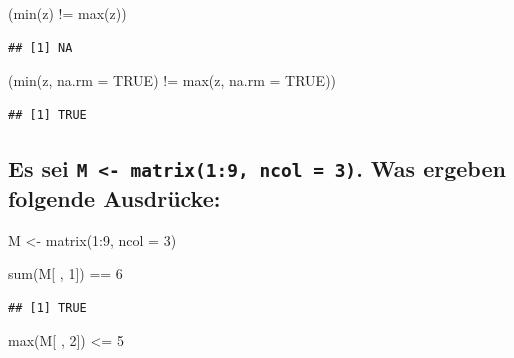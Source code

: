 \documentclass[12pt,a4paper]{article}
\newenvironment{Shaded}{\begin{snugshade}}{\end{snugshade}}
\newcommand{\AttributeTok}[1]{\textcolor[rgb]{0.77,0.63,0.00}{#1}}
\newcommand{\ConstantTok}[1]{\textcolor[rgb]{0.00,0.00,0.00}{#1}}
\newcommand{\DecValTok}[1]{\textcolor[rgb]{0.00,0.00,0.81}{#1}}
\newcommand{\FunctionTok}[1]{\textcolor[rgb]{0.00,0.00,0.00}{#1}}
\newcommand{\NormalTok}[1]{#1}
\newcommand{\OtherTok}[1]{\textcolor[rgb]{0.56,0.35,0.01}{#1}}
\newcommand{\SpecialCharTok}[1]{\textcolor[rgb]{0.00,0.00,0.00}{#1}}
\begin{document}
\begin{Shaded}
\begin{Highlighting}[]
\NormalTok{    (}\FunctionTok{min}\NormalTok{(z) }\SpecialCharTok{!=} \FunctionTok{max}\NormalTok{(z))}
\end{Highlighting}
\end{Shaded}

\begin{verbatim}
## [1] NA
\end{verbatim}

\begin{Shaded}
\begin{Highlighting}[]
\NormalTok{    (}\FunctionTok{min}\NormalTok{(z, }\AttributeTok{na.rm =} \ConstantTok{TRUE}\NormalTok{) }\SpecialCharTok{!=} \FunctionTok{max}\NormalTok{(z, }\AttributeTok{na.rm =} \ConstantTok{TRUE}\NormalTok{))}
\end{Highlighting}
\end{Shaded}

\begin{verbatim}
## [1] TRUE
\end{verbatim}

\hypertarget{es-sei-m---matrix19-ncol-3.-was-ergeben-folgende-ausdruxfccke}{%
\subsection{\texorpdfstring{Es sei
\texttt{M\ \textless{}-\ matrix(1:9,\ ncol\ =\ 3)}. Was ergeben folgende
Ausdrücke:}{Es sei M \textless- matrix(1:9, ncol = 3). Was ergeben folgende Ausdrücke:}}\label{es-sei-m---matrix19-ncol-3.-was-ergeben-folgende-ausdruxfccke}}

\begin{Shaded}
\begin{Highlighting}[]
\NormalTok{    M }\OtherTok{\textless{}{-}} \FunctionTok{matrix}\NormalTok{(}\DecValTok{1}\SpecialCharTok{:}\DecValTok{9}\NormalTok{, }\AttributeTok{ncol =} \DecValTok{3}\NormalTok{)}
    
    \FunctionTok{sum}\NormalTok{(M[ , }\DecValTok{1}\NormalTok{]) }\SpecialCharTok{==} \DecValTok{6}
\end{Highlighting}
\end{Shaded}

\begin{verbatim}
## [1] TRUE
\end{verbatim}

\begin{Shaded}
\begin{Highlighting}[]
    \FunctionTok{max}\NormalTok{(M[ , }\DecValTok{2}\NormalTok{]) }\SpecialCharTok{\textless{}=} \DecValTok{5}
\end{Highlighting}
\end{Shaded}
\end{document}
